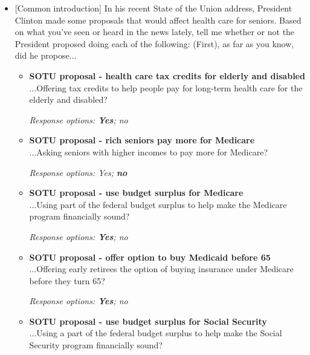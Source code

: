 \documentclass[12pt, letterpaper]{article}
\begin{document}
\begin{itemize}
\item {[Common introduction] In his recent State of the Union address, President Clinton made some proposals that would affect health care for seniors. Based on what you've seen or heard in the news lately, tell me whether or not the President proposed doing each of the following: (First), as far as you know, did he propose...

   \begin{itemize}
\item \textbf{SOTU proposal - health care tax credits for elderly and disabled} \\
...Offering tax credits to help people pay for long-term health care for the elderly and disabled?

\textit{Response options: \textbf{Yes}; no}
\end{itemize}

   \begin{itemize}
\item \textbf{SOTU proposal - rich seniors pay more for Medicare} \\
...Asking seniors with higher incomes to pay more for Medicare?

\textit{Response options: Yes; \textbf{no}}
\end{itemize}

   \begin{itemize}
\item \textbf{SOTU proposal - use budget surplus for Medicare} \\
...Using part of the federal budget surplus to help make the Medicare program financially sound?

\textit{Response options: \textbf{Yes}; no}
\end{itemize}

   \begin{itemize}
\item \textbf{SOTU proposal - offer option to buy Medicaid before 65} \\
...Offering early retirees the option of buying insurance under Medicare before they turn 65?

\textit{Response options: \textbf{Yes}; no}
\end{itemize}

   \begin{itemize}
\item \textbf{SOTU proposal - use budget surplus for Social Security } \\
...Using a part of the federal budget surplus to help make the Social Security program financially sound?


\end{itemize}}
\end{itemize}
\end{document}
